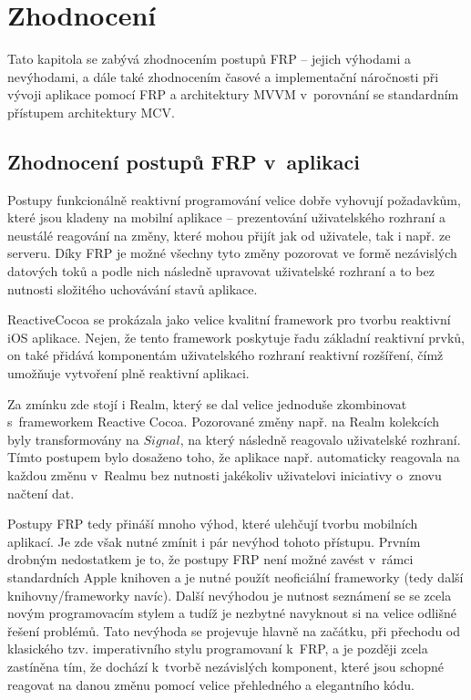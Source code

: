 \documentclass[thesis=M,czech]{FITthesis}[2012/06/26]
\begin{document}
\chapter{Zhodnocení}
Tato kapitola se zabývá zhodnocením postupů FRP -- jejich výhodami a nevýhodami, a dále také zhodnocením časové a implementační náročnosti při vývoji aplikace pomocí FRP a architektury MVVM v~porovnání se standardním přístupem architektury MCV.

\section{Zhodnocení postupů FRP v~aplikaci}
Postupy funkcionálně reaktivní programování velice dobře  vyhovují požadavkům, které jsou kladeny na mobilní aplikace --  prezentování uživatelského rozhraní a neustálé reagování na změny, které mohou přijít jak od uživatele, tak i např. ze serveru. Díky FRP je možné všechny tyto změny pozorovat ve formě nezávislých datových toků a podle nich následně upravovat uživatelské rozhraní a to bez nutnosti složitého uchovávání stavů aplikace.

ReactiveCocoa se prokázala jako velice kvalitní framework pro tvorbu reaktivní iOS aplikace. Nejen, že tento framework poskytuje řadu základní reaktivní prvků, on také přidává komponentám uživatelského rozhraní reaktivní rozšíření, čímž umožňuje vytvoření plně reaktivní aplikaci.

Za zmínku zde stojí i Realm, který se dal velice jednoduše zkombinovat s~frameworkem Reactive Cocoa. Pozorované změny např. na Realm kolekcích byly transformovány na $Signal$, na který následně reagovalo uživatelské rozhraní. Tímto postupem bylo dosaženo toho, že aplikace např. automaticky reagovala na každou změnu v~Realmu bez nutnosti jakékoliv uživatelovi iniciativy o~znovu načtení dat.

Postupy FRP tedy přináší mnoho výhod, které ulehčují tvorbu mobilních aplikací. Je zde však nutné zmínit i pár nevýhod tohoto přístupu. Prvním drobným nedostatkem je to, že postupy FRP není možné zavést v~rámci standardních Apple knihoven a je nutné použít neoficiální frameworky (tedy další knihovny/frameworky navíc). Další nevýhodou je nutnost seznámení se se zcela novým programovacím stylem a tudíž je nezbytné navyknout si na velice odlišné řešení problémů. Tato nevýhoda se projevuje hlavně na začátku, při přechodu od klasického tzv. imperativního stylu programovaní k~FRP, a je později zcela zastíněna tím, že dochází k~tvorbě nezávislých komponent, které jsou schopné reagovat na danou změnu pomocí velice přehledného a elegantního kódu.
\end{document}
